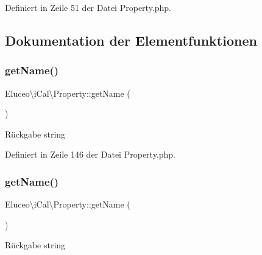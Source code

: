 Definiert in Zeile 51 der Datei Property.\+php.



\subsection{Dokumentation der Elementfunktionen}
\mbox{\label{class_eluceo_1_1i_cal_1_1_property_ab53aefdbce4aa167f433cac2959c2c66}} 
\subsubsection{\texorpdfstring{get\+Name()}{getName()}\hspace{0.1cm}{\footnotesize\ttfamily [1/3]}}
{\footnotesize\ttfamily Eluceo\textbackslash{}i\+Cal\textbackslash{}\+Property\+::get\+Name (\begin{DoxyParamCaption}{ }\end{DoxyParamCaption})}

\begin{DoxyReturn}{Rückgabe}
string 
\end{DoxyReturn}


Definiert in Zeile 146 der Datei Property.\+php.

\mbox{\label{class_eluceo_1_1i_cal_1_1_property_ab53aefdbce4aa167f433cac2959c2c66}} 
\subsubsection{\texorpdfstring{get\+Name()}{getName()}\hspace{0.1cm}{\footnotesize\ttfamily [2/3]}}
{\footnotesize\ttfamily Eluceo\textbackslash{}i\+Cal\textbackslash{}\+Property\+::get\+Name (\begin{DoxyParamCaption}{ }\end{DoxyParamCaption})}

\begin{DoxyReturn}{Rückgabe}
string 
\end{DoxyReturn}


